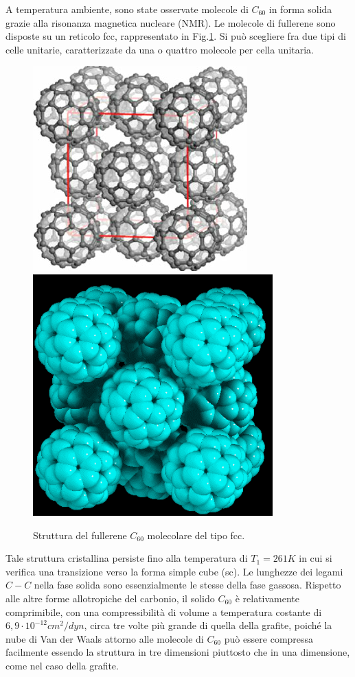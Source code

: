 \documentclass[a4paper,titlepage]{book}
\begin{document}
A temperatura ambiente, sono state osservate molecole di $C_ {60}$ in forma solida grazie alla risonanza magnetica nucleare (NMR). Le molecole di fullerene sono disposte su un reticolo fcc, rappresentato in Fig.\ref{fcc}. Si può scegliere fra due tipi di celle unitarie, caratterizzate da una o quattro molecole per cella unitaria.
\begin{figure}[h!]
	\centering
	\includegraphics[width=.49\textwidth]{cubicfullerene.png}\hfil
	\includegraphics[width=.49\textwidth]{cubicfullfigo.png}
	
	\caption{ Struttura del fullerene $C_{60}$ molecolare del tipo fcc. }\label{fcc}
\end{figure}

Tale struttura cristallina persiste fino alla temperatura di $T_1=261K$ in cui si verifica una transizione verso la forma simple cube (sc).
Le lunghezze dei legami $C-C$ nella fase solida sono essenzialmente le stesse della fase gassosa. 
Rispetto alle altre forme allotropiche del carbonio, il solido $C_ {60}$ è relativamente comprimibile, con una compressibilità di volume a temperatura costante di $6,9 \cdot 10^{-12} cm^2 / dyn$, circa tre volte più grande di quella della grafite, poiché la nube di Van der Waals attorno alle molecole di $C_ {60}$ può essere compressa facilmente essendo la struttura in tre dimensioni piuttosto che in una dimensione, come nel caso della grafite. 
\end{document}
